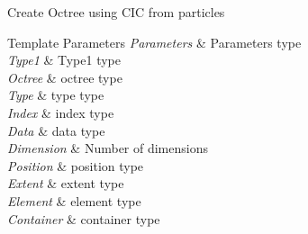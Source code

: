 Create Octree using C\-I\-C from particles 
\begin{DoxyTemplParams}{Template Parameters}
{\em Parameters} & Parameters type \\
\hline
{\em Type1} & Type1 type \\
\hline
{\em Octree} & octree type \\
\hline
{\em Type} & type type \\
\hline
{\em Index} & index type \\
\hline
{\em Data} & data type \\
\hline
{\em Dimension} & Number of dimensions \\
\hline
{\em Position} & position type \\
\hline
{\em Extent} & extent type \\
\hline
{\em Element} & element type \\
\hline
{\em Container} & container type \\
\hline
\end{DoxyTemplParams}

